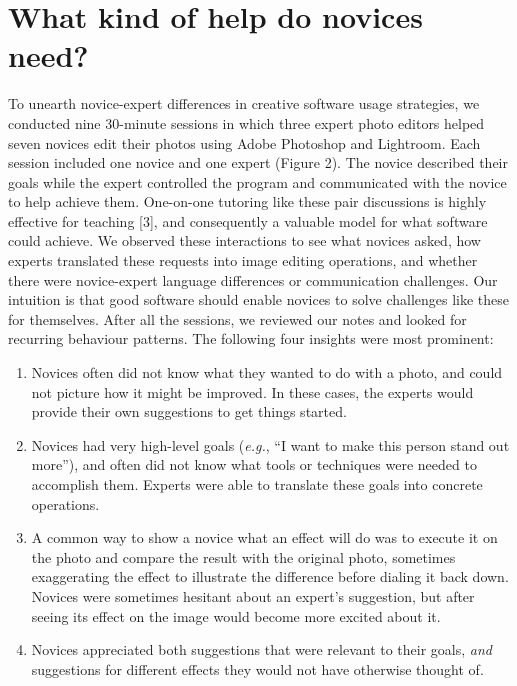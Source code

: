 \section{What kind of help do novices need?}
To unearth novice-expert differences in creative software usage strategies, we conducted nine 30-minute sessions in which three expert photo editors helped seven novices edit their photos using Adobe Photoshop and Lightroom. Each session included one novice and one expert (Figure 2). The novice described their goals while the expert controlled the program and communicated with the novice to help achieve them. One-on-one tutoring like these pair discussions is highly effective for teaching [3], and consequently a valuable model for what software could achieve. We observed these interactions to see what novices asked, how experts translated these requests into image editing operations, and whether there were novice-expert language differences or communication challenges. Our intuition is that good software should enable novices to solve challenges like these for themselves. After all the sessions, we reviewed our notes and looked for recurring behaviour patterns. The following four insights were most prominent:
\begin{enumerate}
    \item Novices often did not know what they wanted to do with a photo, and could not picture how it might be improved. In these cases, the experts would provide their own suggestions to get things started.
    \item Novices had very high-level goals (\textit{e.g.}, ``I want to make this person stand out more''), and often did not know what tools or techniques were needed to accomplish them. Experts were able to translate these goals into concrete operations.
    \item A common way to show a novice what an effect will do was to execute it on the photo and compare the result with the original photo, sometimes exaggerating the effect to illustrate the difference before dialing it back down. Novices were sometimes hesitant about an expert's suggestion, but after seeing its effect on the image would become more excited about it.
    \item Novices appreciated both suggestions that were relevant to their goals, \textit{and} suggestions for different effects they would not have otherwise thought of.
\end{enumerate}

